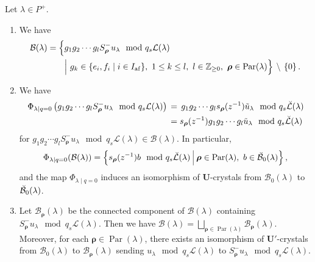 \documentclass[ALCO,ThmDefs,Unicode,epreuves]{cedram}
\newcommand{\BZ}{\mathbb{Z}}
\newcommand\bmrho[1]{\boldsymbol{#1}}
\renewcommand{\U}{\mathbf{U}}
\DeclareMathOperator{\af}{af}
\DeclareMathOperator{\Par}{Par}
\begin{document}
\begin{theo} \label{thm:BN}
Let $\lambda \in P^+$. 
\begin{enumerate}[label=(\arabic*)]
\item\label{Theo2.1_1}
We have
\begin{equation}
\begin{aligned}
\mathcal{B}(\lambda)
=
\Bigl\{ 
&g_1 g_2 \cdots g_l S_{\bmrho{\rho}}^- u_{\lambda} 
\mod q_s \mathcal{L}(\lambda)
 \\%
&
\Bigl|\ g_k \in \{ e_i , f_i \mid i \in I_{\af} \} , \ 
1 \leq k \leq l , \ 
l \in \BZ_{\geq 0}, \ 
\bmrho{\rho} \in \Par (\lambda) 
\Bigr\} 
\, \setminus \, 
\left\{ 0 \right\} .
\end{aligned}
\end{equation}
\item\label{Theo2.1_2}
We have 
\begin{equation}
\label{eq:Phi_q=0}
\begin{aligned} 
\Phi_{\lambda \mid q=0} \left( g_1 g_2 \cdots g_l S_{\bmrho{\rho}}^- u_{\lambda} 
\mod q_s \mathcal{L}(\lambda) \right) 
\, &= \, 
g_1 g_2 \cdots g_l s_{\bmrho{\rho}}(z^{-1}) \Tilde{u}_{\lambda} 
\mod q_s \Breve{\mathcal{L}}(\lambda) \\%
&= 
s_{\bmrho{\rho}}(z^{-1}) g_1 g_2 \cdots g_l \Tilde{u}_{\lambda} 
\mod q_s \Breve{\mathcal{L}}(\lambda)
\end{aligned}
\end{equation}
for 
$g_1 g_2 \cdots g_l S_{\bmrho{\rho}}^- u_{\lambda} 
\mod q_s \mathcal{L}(\lambda)
\in \mathcal{B}(\lambda)$. 
In particular, 
\begin{align}
\Phi_{\lambda \mid q=0} (\mathcal{B}(\lambda))
=
\left\{ 
s_{\bmrho{\rho}}(z^{-1})b 
\mod q_s \Breve{\mathcal{L}}(\lambda)
\ \vline \ 
\bmrho{\rho} \in \Par (\lambda) , \ 
b \in \Breve{\mathcal{B}}_0(\lambda) 
\right\} ,
\end{align}
and the map 
$\Phi_{\lambda \mid q=0}$
induces an isomorphism of $\U$-crystals from
$\mathcal{B}_0(\lambda)$
to $\Breve{\mathcal{B}}_0(\lambda)$.
\item\label{Theo2.1_3}
Let 
$\mathcal{B}_{\bmrho{\rho}}(\lambda)$
be the connected component of $\mathcal{B}(\lambda)$ containing
$S_{\bmrho{\rho}}^- u_{\lambda} \mod q_s \mathcal{L}(\lambda)$. 
Then we have 
$\mathcal{B}(\lambda) = \bigsqcup_{\bmrho{\rho} \in \Par (\lambda)} \mathcal{B}_{\bmrho{\rho}}(\lambda)$.
Moreover, 
for each 
$\bmrho{\rho} \in \Par (\lambda)$, 
there exists an isomorphism of $\U'$-crystals from
$\mathcal{B}_0(\lambda)$
to
$\mathcal{B}_{\bmrho{\rho}}(\lambda)$
sending
$u_{\lambda} \mod q_s \mathcal{L}(\lambda)$
to
$S_{\bmrho{\rho}}^- u_{\lambda} \mod q_s \mathcal{L}(\lambda)$.
\end{enumerate}
\end{theo}
\end{document}
